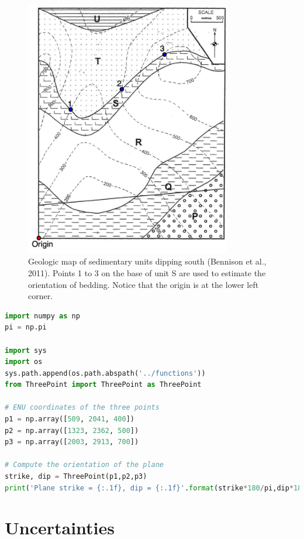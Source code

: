 \documentclass[a4paper , 12pt]{book}
\begin{document}
\begin{figure}[ht]
    \centering
    \includegraphics[width=9cm]{Figures/ch4f7.png}
    \caption{Geologic map of sedimentary units dipping south (Bennison et al., 2011). Points 1 to 3 on the base of unit S are used to estimate the orientation of bedding. Notice that the origin is at the lower left corner.}
\end{figure}

\begin{center}
\begin{lstlisting}[language=Python, frame=single]
import numpy as np
pi = np.pi

import sys
import os
sys.path.append(os.path.abspath('../functions'))
from ThreePoint import ThreePoint as ThreePoint

# ENU coordinates of the three points
p1 = np.array([509, 2041, 400])
p2 = np.array([1323, 2362, 500])
p3 = np.array([2003, 2913, 700])

# Compute the orientation of the plane
strike, dip = ThreePoint(p1,p2,p3)
print('Plane strike = {:.1f}, dip = {:.1f}'.format(strike*180/pi,dip*180/pi))
\end{lstlisting}
\end{center}

\section{Uncertainties}\label{calcuncertainties}
\end{document}
